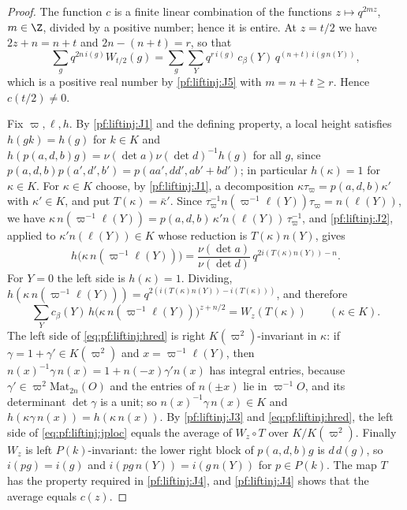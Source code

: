 \begin{proof}
The function $c$ is a finite linear combination of the functions $z\mapsto q^{2mz}$, $m\in\Z$, divided by a positive number; hence it is entire.
At $z=t/2$ we have $2z+n=n+t$ and $2n-(n+t)=r$, so that
\[
\sum_gq^{2n\,i(g)}W_{t/2}(g)=\sum_g\sum_Yq^{r\,i(g)}\,c_\beta(Y)\,q^{(n+t)\,i(g\,n(Y))},
\]
which is a positive real number by \ref{pf:liftinj:J5} with $m=n+t\ge r$. Hence $c(t/2)\ne0$.

Fix $\varpi,\ell,h$. By \ref{pf:liftinj:J1} and the defining property, a local height satisfies $h(gk)=h(g)$ for $k\in K$ and
$h(p(a,d,b)g)=\nu(\det a)\nu(\det d)^{-1}h(g)$ for all $g$, since $p(a,d,b)p(a',d',b')=p(aa',dd',ab'+bd')$; in particular $h(\kappa)=1$ for
$\kappa\in K$. For $\kappa\in K$ choose, by \ref{pf:liftinj:J1}, a decomposition $\kappa\tau_\varpi=p(a,d,b)\kappa'$ with $\kappa'\in K$, and put
$T(\kappa)=\bar\kappa'$. Since $\tau_\varpi^{-1}n(\varpi^{-1}\ell(Y))\tau_\varpi=n(\ell(Y))$, we have
$\kappa\,n(\varpi^{-1}\ell(Y))=p(a,d,b)\,\kappa'n(\ell(Y))\,\tau_\varpi^{-1}$, and \ref{pf:liftinj:J2}, applied to $\kappa'n(\ell(Y))\in K$ whose
reduction is $T(\kappa)n(Y)$, gives
\[
h\bigl(\kappa\,n(\varpi^{-1}\ell(Y))\bigr)=\frac{\nu(\det a)}{\nu(\det d)}\,q^{2i(T(\kappa)n(Y))-n}.
\]
For $Y=0$ the left side is $h(\kappa)=1$. Dividing, $h(\kappa\,n(\varpi^{-1}\ell(Y)))=q^{2(i(T(\kappa)n(Y))-i(T(\kappa)))}$, and therefore
\begin{equation}\label{eq:pf:liftinj:hred}
\sum_Yc_\beta(Y)\,h\bigl(\kappa\,n(\varpi^{-1}\ell(Y))\bigr)^{z+n/2}=W_z(T(\kappa))\qquad(\kappa\in K).
\end{equation}
The left side of \eqref{eq:pf:liftinj:hred} is right $K(\varpi^2)$-invariant in $\kappa$: if $\gamma=1+\gamma'\in K(\varpi^2)$ and
$x=\varpi^{-1}\ell(Y)$, then $n(x)^{-1}\gamma\,n(x)=1+n(-x)\gamma'n(x)$ has integral entries, because $\gamma'\in\varpi^2\mathrm{Mat}_{2n}(O)$ and
the entries of $n(\pm x)$ lie in $\varpi^{-1}O$, and its determinant $\det\gamma$ is a unit; so $n(x)^{-1}\gamma\,n(x)\in K$ and
$h(\kappa\gamma\,n(x))=h(\kappa\,n(x))$. By \ref{pf:liftinj:J3} and \eqref{eq:pf:liftinj:hred}, the left side of \eqref{eq:pf:liftinj:jploc}
equals the average of $W_z\circ T$ over $K/K(\varpi^2)$. Finally $W_z$ is left $P(k)$-invariant: the lower right block of $p(a,d,b)g$ is
$d\,d(g)$, so $i(pg)=i(g)$ and $i(pg\,n(Y))=i(g\,n(Y))$ for $p\in P(k)$. The map $T$ has the property required in \ref{pf:liftinj:J4}, and
\ref{pf:liftinj:J4} shows that the average equals $c(z)$.
\end{proof}

